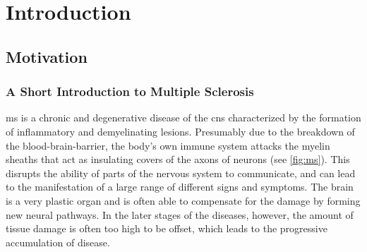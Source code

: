 \chapter{Introduction}


\section{Motivation}

\subsection[A short introduction to multiple sclerosis]{A Short Introduction to
Multiple Sclerosis}

\Gls{ms} is a chronic and degenerative disease of the \gls{cns} characterized by
the formation of inflammatory and demyelinating lesions. Presumably due to the
breakdown of the blood-brain-barrier, the body's own immune system attacks the
myelin sheaths that act as insulating covers of the axons of neurons (see
\ref{fig:ms}). This disrupts the ability of parts of the nervous system to
communicate, and can lead to the manifestation of a large range of different
signs and symptoms. The brain is a very plastic organ and is often able to
compensate for the damage by forming new neural pathways. In the later stages of
the diseases, however, the amount of tissue damage is often too high to be
offset, which leads to the progressive accumulation of disease.


